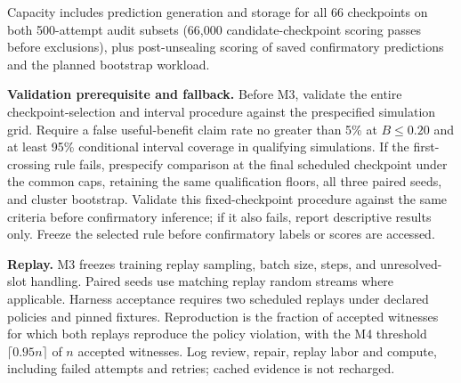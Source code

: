 \documentclass[11pt]{article}
\begin{document}
Capacity includes prediction generation and storage for all 66 checkpoints on both 500-attempt audit subsets (66,000 candidate-checkpoint scoring passes before exclusions), plus post-unsealing scoring of saved confirmatory predictions and the planned bootstrap workload.


\textbf{Validation prerequisite and fallback.} Before M3, validate the entire checkpoint-selection and interval procedure against the prespecified simulation grid. Require a false useful-benefit claim rate no greater than 5\% at $B\leq0.20$ and at least 95\% conditional interval coverage in qualifying simulations. If the first-crossing rule fails, prespecify comparison at the final scheduled checkpoint under the common caps, retaining the same qualification floors, all three paired seeds, and cluster bootstrap. Validate this fixed-checkpoint procedure against the same criteria before confirmatory inference; if it also fails, report descriptive results only. Freeze the selected rule before confirmatory labels or scores are accessed.

\textbf{Replay.} M3 freezes training replay sampling, batch size, steps, and unresolved-slot handling. Paired seeds use matching replay random streams where applicable. Harness acceptance requires two scheduled replays under declared policies and pinned fixtures. Reproduction is the fraction of accepted witnesses for which both replays reproduce the policy violation, with the M4 threshold $\lceil0.95n\rceil$ of $n$ accepted witnesses. Log review, repair, replay labor and compute, including failed attempts and retries; cached evidence is not recharged.
\end{document}
